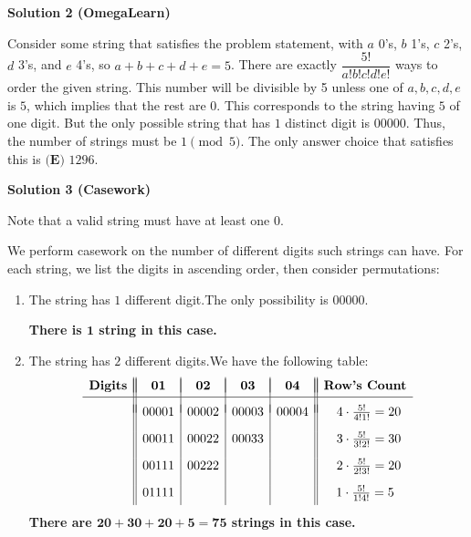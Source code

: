 \begin{enumerate}
 



\textbf{Solution 2 (OmegaLearn)}

Consider some string that satisfies the problem statement, with $a$ 0's, $b$ 1's, $c$ 2's, $d$ 3's, and $e$ 4's, so $a+b+c+d+e=5$. There are exactly $\dfrac{5!}{a!b!c!d!e!}$ ways to order the given string. This number will be divisible by 5 unless one of $a, b, c, d, e$ is $5$, which implies that the rest are $0$. This corresponds to the string having $5$ of one digit. But the only possible string that has $1$ distinct digit is $00000$. Thus, the number of strings must be $1 \pmod{5}$. The only answer choice that satisfies this is $\boxed{\textbf{(E) }1296}$.

 



\textbf{Solution 3 (Casework)}

Note that a valid string must have at least one $0.$

 We perform casework on the number of different digits such strings can have. For each string, we list the digits in ascending order, then consider permutations:

 
            \begin{enumerate} 
        \item The string has $1$ different digit.The only possibility is $00000.$ 

 \textbf{There is $\boldsymbol{1}$ string in this case.} 

 
        \item The string has $2$ different digits.We have the following table:
 \[\begin{array}{c||c|c|c|c||c} & & & & & \\ [-2.5ex] \textbf{Digits} & \boldsymbol{01} & \boldsymbol{02} & \boldsymbol{03} & \boldsymbol{04} & \textbf{Row's Count} \\ [0.5ex] \hline & & & & & \\ [-1.5ex] & 00001 & 00002 & 00003 & 00004 & \hspace{2mm}4\cdot\frac{5!}{4!1!}=20 \\ [2ex]  & 00011 & 00022 & 00033 & & \hspace{2mm}3\cdot\frac{5!}{3!2!}=30 \\ [2ex]  & 00111 & 00222 & & & \hspace{2mm}2\cdot\frac{5!}{2!3!}=20 \\ [2ex]  & 01111 & & & & 1\cdot\frac{5!}{1!4!}=5 \\ [0.75ex] \end{array}\]\textbf{There are $\boldsymbol{20+30+20+5=75}$ strings in this case.} 


\end{enumerate}
\end{enumerate}
